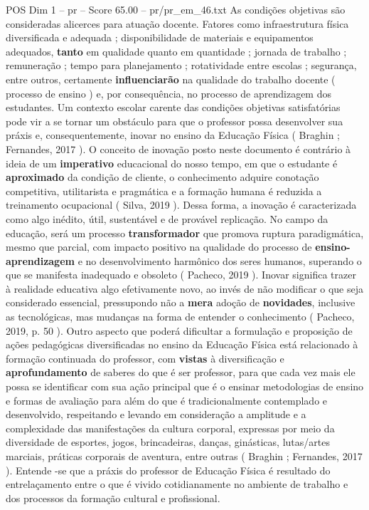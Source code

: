 \begin{textsample}{POS Dim 1 – pr – Score 65.00 – pr/pr\_em\_46.txt}
As condições objetivas são consideradas alicerces para atuação docente.
Fatores como infraestrutura física diversificada e adequada ; disponibilidade de materiais e equipamentos adequados, \textbf{tanto} em qualidade quanto em quantidade ; jornada de trabalho ; remuneração ; tempo para planejamento ; rotatividade entre escolas ; segurança, entre outros, certamente \textbf{influenciarão} na qualidade do trabalho docente ( processo de ensino ) e, por consequência, no processo de aprendizagem dos estudantes.
Um contexto escolar carente das condições objetivas satisfatórias pode vir a se tornar um obstáculo para que o professor possa desenvolver sua práxis e, consequentemente, inovar no ensino da Educação Física ( Braghin ; Fernandes, 2017 ).
O conceito de inovação posto neste documento é contrário à ideia de um \textbf{imperativo} educacional do nosso tempo, em que o estudante é \textbf{aproximado} da condição de cliente, o conhecimento adquire conotação competitiva, utilitarista e pragmática e a formação humana é reduzida a treinamento ocupacional ( Silva, 2019 ).
Dessa forma, a inovação é caracterizada como algo inédito, útil, sustentável e de provável replicação.
No campo da educação, será um processo \textbf{transformador} que promova ruptura paradigmática, mesmo que parcial, com impacto positivo na qualidade do processo de \textbf{ensino-aprendizagem} e no desenvolvimento harmônico dos seres humanos, superando o que se manifesta inadequado e obsoleto ( Pacheco, 2019 ).
Inovar significa trazer à realidade educativa algo efetivamente novo, ao invés de não modificar o que seja considerado essencial, pressupondo não a \textbf{mera} adoção de \textbf{novidades}, inclusive as tecnológicas, mas mudanças na forma de entender o conhecimento ( Pacheco, 2019, p. 50 ).
Outro aspecto que poderá dificultar a formulação e proposição de ações pedagógicas diversificadas no ensino da Educação Física está relacionado à formação continuada do professor, com \textbf{vistas} à diversificação e \textbf{aprofundamento} de saberes do que é ser professor, para que cada vez mais ele possa se identificar com sua ação principal que é o ensinar metodologias de ensino e formas de avaliação para além do que é tradicionalmente contemplado e desenvolvido, respeitando e levando em consideração a amplitude e a complexidade das manifestações da cultura corporal, expressas por meio da diversidade de esportes, jogos, brincadeiras, danças, ginásticas, lutas/artes marciais, práticas corporais de aventura, entre outras ( Braghin ; Fernandes, 2017 ).
Entende -se que a práxis do professor de Educação Física é resultado do entrelaçamento entre o que é vivido cotidianamente no ambiente de trabalho e dos processos da formação cultural e profissional.

\end{textsample}
